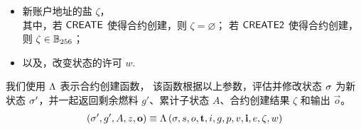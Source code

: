 \begin{itemize}[nosep]
	\item 新账户地址的盐 $\zeta$，\\
	其中，若 {\hyperlink{create}{$\mathsf{CREATE}$}} 使得合约创建，则 $\zeta = \varnothing$；
	若 {\hyperlink{create2}{$\mathsf{CREATE2}$}} 使得合约创建，则 $\zeta\in \mathbb{B}_{256}$；

	\item 以及，改变状态的许可 $w$.
\end{itemize}


我们使用 $\mathrm{\Lambda}$ 表示合约创建函数，
该函数根据以上参数，评估并修改状态 $\mathbf{\sigma}$ 为新状态 $\mathbf{\sigma}'$，并一起返回剩余燃料 $g'$、累计子状态 $A$、合约创建结果 $\zeta$ 和输出 $\vec{o}$。
\begin{align}
	\left(\mathbf{\sigma}',g', A, z, \mathbf{o} \right)\equiv \mathrm{\Lambda}\left(\mathbf{\sigma}, s, o, \mathbf{t},i, g, p, v, \mathbf{i}, e, \zeta,w \right)
\end{align}

